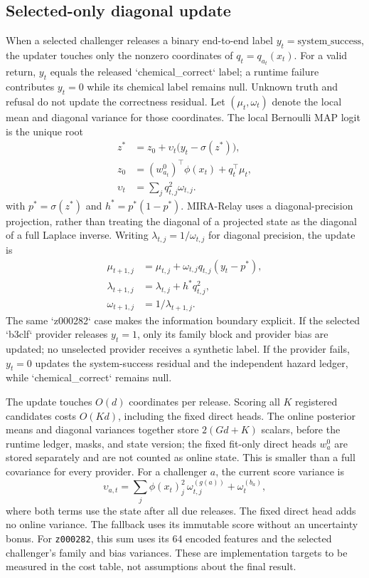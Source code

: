 \documentclass[sigconf,anonymous]{aamas}
\begin{document}
\subsection{Selected-only diagonal update}
When a selected challenger releases a binary end-to-end label $y_t=\mathrm{system\_success}$, the updater touches only the nonzero coordinates of $q_t=q_{a_t}(x_t)$. For a valid return, $y_t$ equals the released `chemical\_correct` label; a runtime failure contributes $y_t=0$ while its chemical label remains null. Unknown truth and refusal do not update the correctness residual. Let $(\mu_t,\omega_t)$ denote the local mean and diagonal variance for those coordinates. The local Bernoulli MAP logit is the unique root
$$
\begin{aligned}
z^*&=z_0+\upsilon_t\bigl(y_t-\sigma(z^*)\bigr),\\
z_0&=(w_{a_t}^0)^\top\phi(x_t)+q_t^\top\mu_t,\\
\upsilon_t&=\sum_j q_{t,j}^2\omega_{t,j}.
\end{aligned}
$$
with $p^*=\sigma(z^*)$ and $h^*=p^*(1-p^*)$. MIRA-Relay uses a diagonal-precision projection, rather than treating the diagonal of a projected state as the diagonal of a full Laplace inverse. Writing $\lambda_{t,j}=1/\omega_{t,j}$ for diagonal precision, the update is
$$
\begin{aligned}
\mu_{t+1,j}&=\mu_{t,j}+\omega_{t,j}q_{t,j}(y_t-p^*),\\
\lambda_{t+1,j}&=\lambda_{t,j}+h^*q_{t,j}^2,\\
\omega_{t+1,j}&=1/\lambda_{t+1,j}.
\end{aligned}
$$
The same `z000282` case makes the information boundary explicit. If the selected `b3clf` provider releases $y_t=1$, only its family block and provider bias are updated; no unselected provider receives a synthetic label. If the provider fails, $y_t=0$ updates the system-success residual and the independent hazard ledger, while `chemical\_correct` remains null.

The update touches $O(d)$ coordinates per release. Scoring all $K$ registered candidates costs
$O(Kd)$, including the fixed direct heads. The online posterior means and diagonal variances
together store $2(Gd+K)$ scalars, before the runtime ledger, masks, and state version; the fixed
fit-only direct heads $w_a^0$ are stored separately and are not counted as online state. This is
smaller than a full covariance for every provider.
For a challenger $a$, the current score variance is
$$
\upsilon_{a,t}=\sum_j \phi(x_t)_j^{2}\,\omega^{(g(a))}_{t,j}+\omega^{(b_a)}_t,
$$
where both terms use the state after all due releases. The fixed direct head adds no online variance. The fallback uses its immutable score without an uncertainty bonus. For \texttt{z000282}, this sum uses its 64 encoded features and the selected challenger's family and bias variances.
These are implementation targets to be measured in the cost table, not assumptions about the final result.
\end{document}
